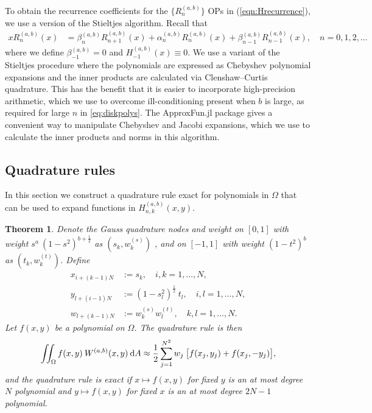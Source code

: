 \documentclass[11pt, oneside]{article}   	%
\newcommand{\sotodo}{\todo[color=green]}
\newcommand{\half}{\frac{1}{2}}
\newcommand{\hdop}{H}
\newcommand{\hdopnkab}{\hdop_{n,k}^{(a,b)}}
\newcommand{\Wab}{{W^{(a,b)}}}
\newcommand{\genjac}{R}
\newtheorem{theorem}{Theorem}
\begin{document}
To obtain the recurrence coefficients for the $\{\genjac_n^{(a,b)}\}$ OPs in (\ref{eqn:Hrecurrence}), we use a version of the Stieltjes algorithm. Recall that\sotodo{check this}
\begin{align*}
	x \genjac_n^{(a,b)}(x) &= \beta_n^{(a,b)} \genjac_{n+1}^{(a,b)}(x) + \alpha_n^{(a,b)} \genjac_n^{(a,b)}(x) + \beta_{n-1}^{(a,b)} \genjac_{n-1}^{(a,b)}(x), \quad n = 0,1,2,\dots
\end{align*}
where we define $\beta_{-1}^{(a,b)} = 0$ and $H_{-1}^{(a,b)}(x) \equiv 0$. We use a variant of the Stieltjes procedure \cite{gautschi1982generating} where the polynomials are expressed as Chebyshev polynomial expansions and the inner products are calculated via Clenshaw--Curtis quadrature. This has the benefit that it is easier to incorporate high-precision arithmetic, which we use to overcome ill-conditioning present when $b$ is large, as required for large $n$ in \eqref{eq:diskpolys}. The ApproxFun.jl \cite{ApproxFun} package gives a convenient way to manipulate Chebyshev and Jacobi expansions, which we use to calculate the inner products and norms in this algorithm.


\subsection{Quadrature rules}

In this section we construct a quadrature rule exact for polynomials in $\Omega$ that can be used to expand functions in $\hdopnkab(x,y)$. 

\begin{theorem}

Denote the  Gauss quadrature nodes and weight on \([0,1]\) with weight \(s^a \: (1-s^2)^{b+\half}\) as $(s_k,w_k^{(s)})$ , and
 on \([-1,1]\) with weight \((1-t^2)^b\) as $(t_k,w_k^{(t)})$. Define
\begin{align*}
x_{i+(k-1)N} &:= s_k, \quad i,k = 1,\dots,N, \\
y_{l+(i-1)N} &:= (1-s_l^2)^\half \: t_l, \quad i,l = 1,\dots,N, \\
w_{l+(k-1)N} &:= w_k^{(s)} w_l^{(t)}, \quad k,l = 1,\dots,N.
\end{align*}
Let $f(x,y)$ be a polynomial on $\Omega$. The quadrature rule is then
$$
\iint_\Omega f(x,y) \: \Wab(x,y) \: \D A \approx \half \sum_{j=1}^{N^2} w_j \: \big[ f(x_j, y_j) + f(x_j, -y_j) \big],
$$
and the quadrature rule is exact if $x \mapsto f(x,y)$ for fixed $y$ is an at most degree $N$ polynomial and $y \mapsto f(x,y)$ for fixed $x$ is an at most degree $2N-1$ polynomial.
\end{theorem}
\end{document}
